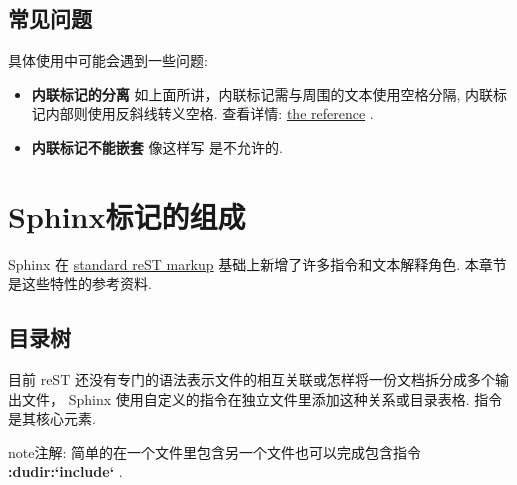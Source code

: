 \documentclass[letterpaper,10pt,english]{sphinxmanual}
\begin{document}
\section{常见问题}
\label{rest:id151}
具体使用中可能会遇到一些问题:
\begin{itemize}
\item {} 
\textbf{内联标记的分离} 如上面所讲，内联标记需与周围的文本使用空格分隔, 内联标记内部则使用反斜线转义空格.  查看详情: \href{http://docutils.sf.net/docs/ref/rst/restructuredtext.html\#inline-markup}{the reference} .

\item {} 
\textbf{内联标记不能嵌套}  像这样写  是不允许的.

\end{itemize}


\chapter{Sphinx标记的组成}
\label{markup/index:sphinx}\label{markup/index:sphinxmarkup}\label{markup/index::doc}
Sphinx 在 \href{http://docutils.sourceforge.net/docs/ref/rst/restructuredtext.html}{standard reST
markup} 基础上新增了许多指令和文本解释角色.  本章节是这些特性的参考资料.


\section{目录树}
\label{markup/toctree:id1}\label{markup/toctree:toctree-directive}\label{markup/toctree::doc}
目前 reST 还没有专门的语法表示文件的相互关联或怎样将一份文档拆分成多个输出文件，
Sphinx 使用自定义的指令在独立文件里添加这种关系或目录表格.
指令  是其核心元素.

\begin{notice}{note}{注解:}
简单的在一个文件里包含另一个文件也可以完成包含指令 {\color{red}\bfseries{}:dudir:{}`include{}`} .
\end{notice}
\end{document}
